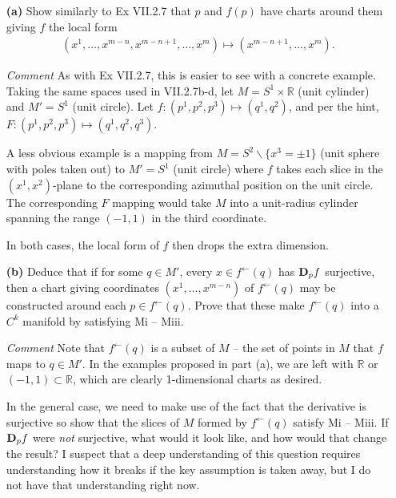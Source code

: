 \documentclass[11pt]{article}
\begin{document}
\begin{itemize}
\item[\textbf{(a)}] Show similarly to Ex VII.2.7 that $p$ and $f(p)$ have charts
  around them giving $f$ the local form
  \begin{align}
    (x^1,\ldots, x^{m-n}, x^{m-n+1},\ldots,x^m) \mapsto (x^{m-n+1},\ldots,x^m).
  \end{align}

\item[\emph{Comment}] As with Ex VII.2.7, this is easier to see with a concrete
  example.  Taking the same spaces used in VII.2.7b-d, let $M =
  S^1\times\mathbb{R}$ (unit cylinder) and $M' = S^1$ (unit circle).  Let $f
  \colon (p^1,p^2,p^3) \mapsto (q^1,q^2)$, and per the hint, $F \colon
  (p^1,p^2,p^3) \mapsto (q^1,q^2,q^3 )$.

  A less obvious example is a mapping from $M = S^2\backslash\{x^3 = \pm 1\}$ (unit
  sphere with poles taken out) to $M' = S^1$ (unit circle) where $f$ takes each
  slice in the $(x^1,x^2)$-plane to the corresponding azimuthal position on the
  unit circle.  The corresponding $F$ mapping would take $M$ into a unit-radius
  cylinder spanning the range $(-1,1)$ in the third coordinate.

  In both cases, the local form of $f$ then drops the extra dimension.

\item[\textbf{(b)}] Deduce that if for some $q \in M'$, every $x \in
  f^\leftarrow(q)$ has ${\bf D}_pf$ surjective, then a chart giving coordinates
  $(x^1,\ldots,x^{m-n})$ of $f^\leftarrow(q)$ may be constructed around each $p
  \in f^\leftarrow(q)$.  Prove that these make $f^\leftarrow(q)$ into a $C^k$
  manifold by satisfying Mi -- Miii.

\item[\emph{Comment}] Note that $f^\leftarrow(q)$ is a subset of $M$ -- the set of
  points in $M$ that $f$ maps to $q \in M'$.  In the examples proposed in part
  (a), we are left with $\mathbb{R}$ or $(-1,1) \subset \mathbb{R}$, which are
  clearly 1-dimensional charts as desired.

  In the general case, we need to make use of the fact that the derivative is
  surjective so show that the slices of $M$ formed by $f^\leftarrow(q)$ satisfy
  Mi -- Miii.  If ${\bf D}_pf$ were \emph{not} surjective, what would it look
  like, and how would that change the result?  I suspect that a deep
  understanding of this question requires understanding how it breaks if the key
  assumption is taken away, but I do not have that understanding right now.


\end{itemize}
\end{document}
